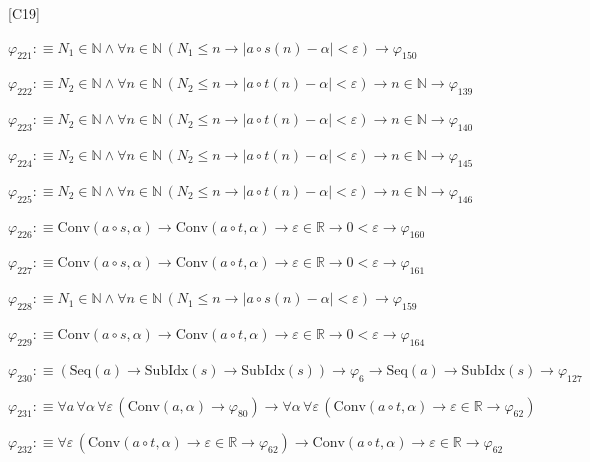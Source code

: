 \begin{fullproof}{[C19]}
\begin{abbrevlist}
\item $\varphi_{221} :\equiv N_{1} \in \mathbb{N} \land \forall n \in \mathbb{N}\,(N_{1} \leq n \to \lvert a \circ s(n) - \alpha \rvert < \varepsilon) \to \varphi_{150}$
\item $\varphi_{222} :\equiv N_{2} \in \mathbb{N} \land \forall n \in \mathbb{N}\,(N_{2} \leq n \to \lvert a \circ t(n) - \alpha \rvert < \varepsilon) \to n \in \mathbb{N} \to \varphi_{139}$
\item $\varphi_{223} :\equiv N_{2} \in \mathbb{N} \land \forall n \in \mathbb{N}\,(N_{2} \leq n \to \lvert a \circ t(n) - \alpha \rvert < \varepsilon) \to n \in \mathbb{N} \to \varphi_{140}$
\item $\varphi_{224} :\equiv N_{2} \in \mathbb{N} \land \forall n \in \mathbb{N}\,(N_{2} \leq n \to \lvert a \circ t(n) - \alpha \rvert < \varepsilon) \to n \in \mathbb{N} \to \varphi_{145}$
\item $\varphi_{225} :\equiv N_{2} \in \mathbb{N} \land \forall n \in \mathbb{N}\,(N_{2} \leq n \to \lvert a \circ t(n) - \alpha \rvert < \varepsilon) \to n \in \mathbb{N} \to \varphi_{146}$
\item $\varphi_{226} :\equiv \mathrm{Conv}(a \circ s,\alpha) \to \mathrm{Conv}(a \circ t,\alpha) \to \varepsilon \in \mathbb{R} \to 0 < \varepsilon \to \varphi_{160}$
\item $\varphi_{227} :\equiv \mathrm{Conv}(a \circ s,\alpha) \to \mathrm{Conv}(a \circ t,\alpha) \to \varepsilon \in \mathbb{R} \to 0 < \varepsilon \to \varphi_{161}$
\item $\varphi_{228} :\equiv N_{1} \in \mathbb{N} \land \forall n \in \mathbb{N}\,(N_{1} \leq n \to \lvert a \circ s(n) - \alpha \rvert < \varepsilon) \to \varphi_{159}$
\item $\varphi_{229} :\equiv \mathrm{Conv}(a \circ s,\alpha) \to \mathrm{Conv}(a \circ t,\alpha) \to \varepsilon \in \mathbb{R} \to 0 < \varepsilon \to \varphi_{164}$
\item $\varphi_{230} :\equiv (\mathrm{Seq}(a) \to \mathrm{SubIdx}(s) \to \mathrm{SubIdx}(s)) \to \varphi_{6} \to \mathrm{Seq}(a) \to \mathrm{SubIdx}(s) \to \varphi_{127}$
\item $\varphi_{231} :\equiv \forall a\,\forall \alpha\,\forall \varepsilon\,(\mathrm{Conv}(a,\alpha) \to \varphi_{80}) \to \forall \alpha\,\forall \varepsilon\,(\mathrm{Conv}(a \circ t,\alpha) \to \varepsilon \in \mathbb{R} \to \varphi_{62})$
\item $\varphi_{232} :\equiv \forall \varepsilon\,(\mathrm{Conv}(a \circ t,\alpha) \to \varepsilon \in \mathbb{R} \to \varphi_{62}) \to \mathrm{Conv}(a \circ t,\alpha) \to \varepsilon \in \mathbb{R} \to \varphi_{62}$

\end{abbrevlist}
\end{fullproof}
